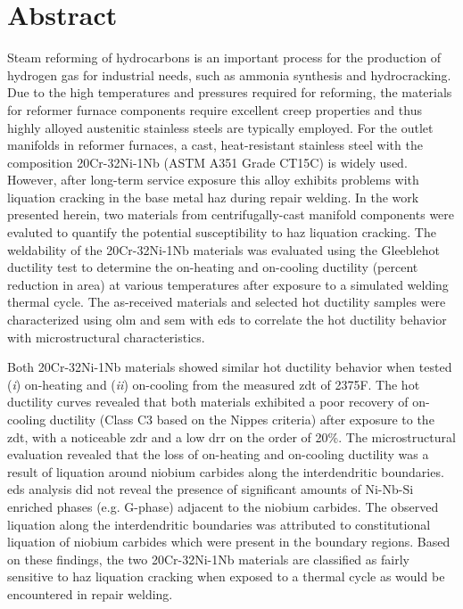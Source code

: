 \chapter*{Abstract}\label{ch:abstract}
Steam reforming of hydrocarbons is an important process for the production of hydrogen gas for industrial needs, such as ammonia synthesis and hydrocracking. Due to the high temperatures and pressures required for reforming, the materials for reformer furnace components require excellent creep properties and thus highly alloyed austenitic stainless steels are typically employed. For the outlet manifolds in reformer furnaces, a cast, heat-resistant stainless steel with the composition 20Cr-32Ni-1Nb (ASTM A351 Grade CT15C) is widely used. However, after long-term service exposure this alloy exhibits problems with liquation cracking in the base metal \gls{haz} during repair welding. In the work presented herein, two materials from centrifugally-cast manifold components were evaluted to quantify the potential susceptibility to \gls{haz} liquation cracking. The weldability of the 20Cr-32Ni-1Nb materials was evaluated using the Gleeble\texttrademark  hot ductility test to determine the on-heating and on-cooling ductility (percent reduction in area) at various temperatures after exposure to a simulated welding thermal cycle. The as-received materials and selected hot ductility samples were characterized using \gls{olm} and \gls{sem} with \gls{eds} to correlate the hot ductility behavior with microstructural characteristics.

Both 20Cr-32Ni-1Nb materials showed similar hot ductility behavior when tested (\emph{i}) on-heating and (\emph{ii}) on-cooling from the measured \gls{zdt} of 2375\textdegree{}F. The hot ductility curves revealed that both materials exhibited a poor recovery of on-cooling ductility (Class C3 based on the Nippes criteria) after exposure to the \gls{zdt}, with a noticeable \gls{zdr} and a low \gls{drr} on the order of 20\%. The microstructural evaluation revealed that the loss of on-heating and on-cooling ductility was a result of liquation around niobium carbides along the interdendritic boundaries. \gls{eds} analysis did not reveal the presence of significant amounts of Ni-Nb-Si enriched phases (e.g. G-phase) adjacent to the niobium carbides. The observed liquation along the interdendritic boundaries was attributed to constitutional liquation of niobium carbides which were present in the boundary regions. Based on these findings, the two 20Cr-32Ni-1Nb materials are classified as fairly sensitive to \gls{haz} liquation cracking when exposed to a thermal cycle as would be encountered in repair welding.




